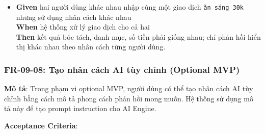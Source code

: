 \begin{itemize}
\item \textbf{Given} hai người dùng khác nhau nhập cùng một giao dịch \texttt{ăn sáng 30k} nhưng sử dụng nhân cách khác nhau  \\ \hspace*{1.5em}  \textbf{When} hệ thống xử lý giao dịch cho cả hai  \\ \hspace*{1.5em}  \textbf{Then} kết quả bóc tách, danh mục, số tiền phải giống nhau; chỉ phản hồi hiển thị khác nhau theo nhân cách từng người dùng.
\end{itemize}
\subsubsection{FR-09-08: Tạo nhân cách AI tùy chỉnh (Optional MVP)}

\textbf{Mô tả}: Trong phạm vi optional MVP, người dùng có thể tạo nhân cách AI tùy chỉnh bằng cách mô tả phong cách phản hồi mong muốn. Hệ thống sử dụng mô tả này để tạo prompt instruction cho AI Engine.



\textbf{Acceptance Criteria}:

